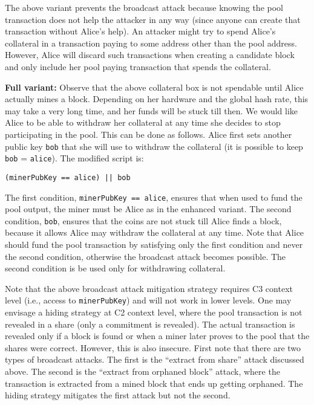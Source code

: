 \documentclass[runningheads]{llncs}
\begin{document}
The above variant prevents the broadcast attack because knowing the pool transaction does not help the attacker in any way (since anyone can create that transaction without Alice's help). An attacker might try to spend Alice's collateral in a transaction paying to some address other than the pool address. However, Alice will discard such transactions when creating a candidate block and only include her pool paying transaction that spends the collateral. 

\textbf{Full variant:} Observe that the above collateral box is not spendable until Alice actually mines a block. Depending on her hardware and the global hash rate, this may take a very long time, and her funds will be stuck till then. We would like Alice to be able to withdraw her collateral at any time she decides to stop participating in the pool. This can be done as follows. Alice first sets another public key \texttt{bob} that she will use to withdraw the collateral (it is possible to keep \texttt{bob} = \texttt{alice}). The modified script is:

\begin{verbatim}
(minerPubKey == alice) || bob
\end{verbatim}

The first condition, \texttt{minerPubKey == alice}, ensures that when used to fund the pool output, the miner must be Alice as in the enhanced variant. The second condition, \texttt{bob}, ensures that the coins are not stuck till Alice finds a block, because it allows Alice may withdraw the collateral at any time.
Note that Alice should fund the pool transaction by satisfying only the first condition and never the second condition, otherwise the broadcast attack becomes possible. The second condition is be used only for withdrawing collateral.

Note that the above broadcast attack mitigation strategy requires C3 context level (i.e., access to \texttt{minerPubKey}) and will not work in lower levels. One may envisage a hiding strategy at C2 context level, where the pool transaction is not revealed in a share (only a commitment is revealed). The actual transaction is revealed only if a block is found or when a miner later proves to the pool that the shares were correct. However, this is also insecure. First note that there are two types of broadcast attacks. The first is the ``extract from share'' attack discussed above. The second is the ``extract from orphaned block'' attack, where the transaction is extracted from a mined block that ends up getting orphaned. The hiding strategy mitigates the first attack but not the second. 
\end{document}
